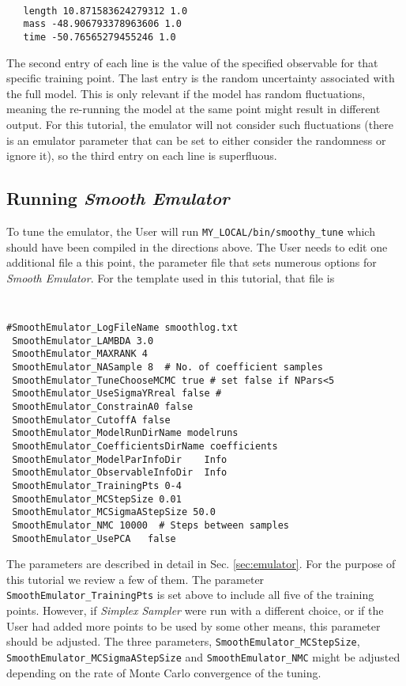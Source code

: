 \documentclass[UserManual.tex]{subfiles}
\begin{document}
{\tt
\begin{verbatim}
   length 10.871583624279312 1.0
   mass -48.906793378963606 1.0
   time -50.76565279455246 1.0
\end{verbatim}
}
The second entry of each line is the value of the specified observable for that specific training point. The last entry is the random uncertainty associated with the full model. This is only relevant if the model has random fluctuations, meaning the re-running the model at the same point might result in different output. For this tutorial, the emulator will not consider such fluctuations (there is an emulator parameter that can be set to either consider the randomness or ignore it), so the third entry on each line is superfluous.

\subsection{Running {\it Smooth Emulator}}
To tune the emulator, the User will run {\tt MY\_LOCAL/bin/smoothy\_tune} which should have been compiled in the directions above. The User needs to edit one additional file a this point, the parameter file that sets numerous options for {\it Smooth Emulator}. For the template used in this tutorial, that file is

{\tt
\begin{verbatim}
#SmoothEmulator_LogFileName smoothlog.txt
 SmoothEmulator_LAMBDA 3.0
 SmoothEmulator_MAXRANK 4
 SmoothEmulator_NASample 8  # No. of coefficient samples
 SmoothEmulator_TuneChooseMCMC true # set false if NPars<5
 SmoothEmulator_UseSigmaYRreal false # 
 SmoothEmulator_ConstrainA0 false
 SmoothEmulator_CutoffA false
 SmoothEmulator_ModelRunDirName modelruns
 SmoothEmulator_CoefficientsDirName coefficients
 SmoothEmulator_ModelParInfoDir    Info
 SmoothEmulator_ObservableInfoDir  Info
 SmoothEmulator_TrainingPts 0-4
 SmoothEmulator_MCStepSize 0.01
 SmoothEmulator_MCSigmaAStepSize 50.0
 SmoothEmulator_NMC 10000  # Steps between samples 
 SmoothEmulator_UsePCA   false
\end{verbatim}
}
The parameters are described in detail in Sec. \ref{sec:emulator}. For the purpose of this tutorial we review a few of them. The parameter {\tt SmoothEmulator\_TrainingPts} is set above to include all five of the training points. However, if {\it Simplex Sampler} were run with a different choice, or if the User had added more points to be used by some other means, this parameter should be adjusted. The three parameters, {\tt SmoothEmulator\_MCStepSize}, {\tt SmoothEmulator\_MCSigmaAStepSize} and {\tt SmoothEmulator\_NMC} might be adjusted depending on the rate of Monte Carlo convergence of the tuning.
\end{document}
